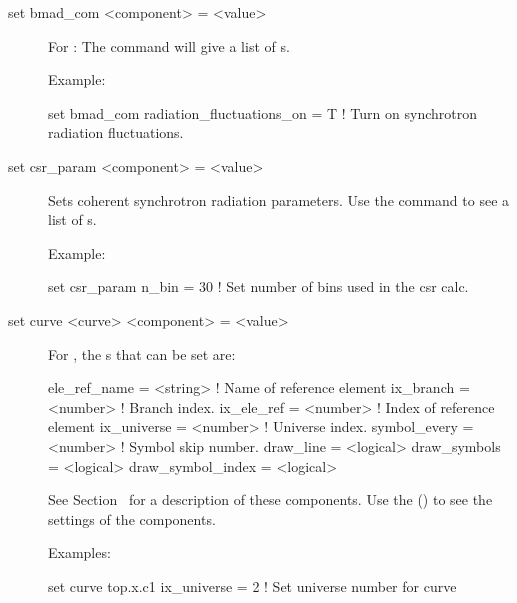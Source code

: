 {{\begin{description}

\item[set bmad_com <component> = <value>] \Newline

\vskip -0.2in

For : The  command will give a list of 
s.

Example:
\begin{example}
  set bmad_com radiation_fluctuations_on = T ! Turn on synchrotron radiation fluctuations.
\end{example}


\item[set csr_param <component> = <value>] \Newline

\vskip -0.2in

Sets coherent synchrotron radiation parameters. Use the  command to see a list of s.

Example:
\begin{example}
  set csr_param n_bin = 30  ! Set number of bins used in the csr calc.
\end{example}


\item[set curve <curve> <component> = <value>] \Newline

\vskip -0.2in

For , the s that can be set are:
\begin{example}
  ele_ref_name      = <string>  ! Name of reference element
  ix_branch         = <number>  ! Branch index.
  ix_ele_ref        = <number>  ! Index of reference element
  ix_universe       = <number>  ! Universe index.
  symbol_every      = <number>  ! Symbol skip number.
  draw_line         = <logical> 
  draw_symbols      = <logical> 
  draw_symbol_index = <logical> 
\end{example}
See Section~ for a description of these components.
Use the  () to see the settings of the
components.

Examples:
\begin{example}
  set curve top.x.c1 ix_universe = 2  ! Set universe number for curve
\end{example}


\end{description}}}
